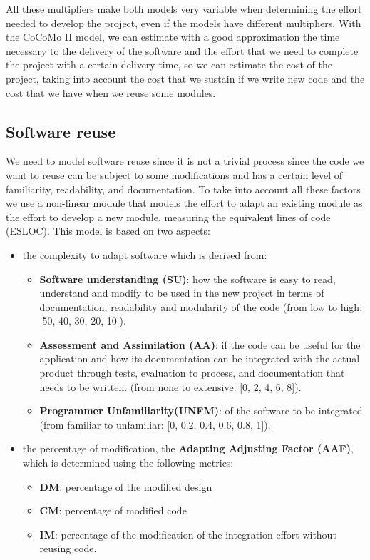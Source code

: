 All these multipliers make both models very variable when determining the effort needed to develop the project, even if the models have different multipliers.
With the CoCoMo II model, we can estimate with a good approximation the time necessary to the delivery of the software and the effort that we need to complete the project with a certain delivery time, so we can estimate the cost of the project, taking into account the cost that we sustain if we write new code and the cost that we have when we reuse some modules.

\subsection{Software reuse}
We need to model software reuse since it is not a trivial process since the code we want to reuse can be subject to some modifications and has a certain level of familiarity, readability, and documentation.
To take into account all these factors we use a non-linear module that models the effort to adapt an existing module as the effort to develop a new module, measuring the equivalent lines of code (ESLOC). This model is based on two aspects:
\begin{itemize}
    \item the complexity to adapt software which is derived from:
          \begin{itemize}
              \item \textbf{Software understanding (SU)}: how the software is easy to read, understand and modify to be used in the new project in terms of documentation, readability and modularity of the code (from low to high: [50, 40, 30, 20, 10]).
              \item \textbf{Assessment and Assimilation (AA)}: if the code can be useful for the application and how its documentation can be integrated with the actual product through tests, evaluation to process, and documentation that needs to be written. (from none to extensive: [0, 2, 4, 6, 8]).
              \item \textbf{Programmer Unfamiliarity(UNFM)}: of the software to be integrated (from familiar to unfamiliar: [0, 0.2, 0.4, 0.6, 0.8, 1]).
          \end{itemize}
    \item the percentage of modification, the \textbf{Adapting Adjusting Factor (AAF)}, which is determined using the following metrics:
          \begin{itemize}
              \item \textbf{DM}: percentage of the modified design
              \item \textbf{CM}: percentage of modified code
              \item \textbf{IM}: percentage of the modification of the integration effort without reusing code.
          \end{itemize}
\end{itemize}
